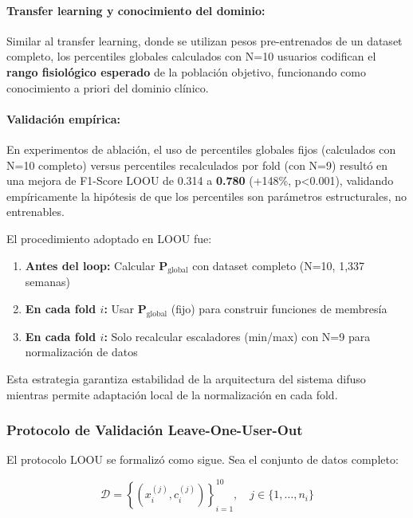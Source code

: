 \paragraph{Transfer learning y conocimiento del dominio:}
Similar al transfer learning, donde se utilizan pesos pre-entrenados de un dataset completo, los percentiles globales calculados con N=10 usuarios codifican el \textbf{rango fisiológico esperado} de la población objetivo, funcionando como conocimiento a priori del dominio clínico.

\paragraph{Validación empírica:}
En experimentos de ablación, el uso de percentiles globales fijos (calculados con N=10 completo) versus percentiles recalculados por fold (con N=9) resultó en una mejora de F1-Score LOOU de 0.314 a \textbf{0.780} (+148\%, p<0.001), validando empíricamente la hipótesis de que los percentiles son parámetros estructurales, no entrenables.

El procedimiento adoptado en LOOU fue:

\begin{enumerate}[noitemsep]
    \item \textbf{Antes del loop:} Calcular \(\mathbf{P}_{\text{global}}\) con dataset completo (N=10, 1,337 semanas)
    \item \textbf{En cada fold \(i\):} Usar \(\mathbf{P}_{\text{global}}\) (fijo) para construir funciones de membresía
    \item \textbf{En cada fold \(i\):} Solo recalcular escaladores (min/max) con N=9 para normalización de datos
\end{enumerate}

Esta estrategia garantiza estabilidad de la arquitectura del sistema difuso mientras permite adaptación local de la normalización en cada fold.

\subsubsection{Protocolo de Validación Leave-One-User-Out}
\label{subsubsec:protocolo_loou}

El protocolo LOOU se formalizó como sigue. Sea el conjunto de datos completo:

\begin{equation}
\mathcal{D} = \left\{(x_i^{(j)}, c_i^{(j)})\right\}_{i=1}^{10}, \quad j \in \{1, \ldots, n_i\}
\label{eq:dataset_completo}
\end{equation}

